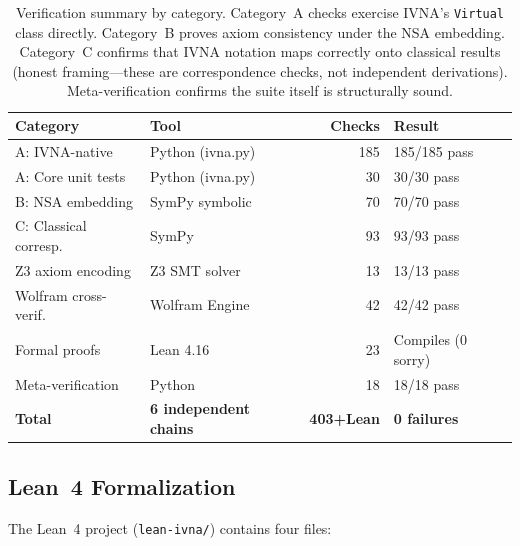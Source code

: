 \documentclass[12pt]{article}
\theoremstyle{definition}
\theoremstyle{remark}
\begin{document}
\begin{table}[h]
\centering
\begin{tabular}{llrl}
\toprule
\textbf{Category} & \textbf{Tool} & \textbf{Checks} & \textbf{Result} \\
\midrule
A: IVNA-native       & Python (ivna.py)          & 185 & 185/185 pass \\
A: Core unit tests   & Python (ivna.py)          & 30  & 30/30 pass \\
B: NSA embedding     & SymPy symbolic            & 70  & 70/70 pass \\
C: Classical corresp. & SymPy                    & 93  & 93/93 pass \\
Z3 axiom encoding    & Z3 SMT solver             & 13  & 13/13 pass \\
Wolfram cross-verif. & Wolfram Engine            & 42  & 42/42 pass \\
Formal proofs        & Lean 4.16                 & 23  & Compiles (0 sorry) \\
Meta-verification    & Python                    & 18  & 18/18 pass \\
\midrule
\textbf{Total}       & \textbf{6 independent chains} & \textbf{403+Lean} & \textbf{0 failures} \\
\bottomrule
\end{tabular}
\caption{Verification summary by category. Category~A checks exercise
IVNA's \texttt{Virtual} class directly. Category~B proves axiom
consistency under the NSA embedding. Category~C confirms that IVNA
notation maps correctly onto classical results (honest framing---these
are correspondence checks, not independent derivations).
Meta-verification confirms the suite itself is structurally sound.}
\label{tab:verification}
\end{table}

\subsection{Lean~4 Formalization}

The Lean~4 project (\texttt{lean-ivna/}) contains four files:
\end{document}
